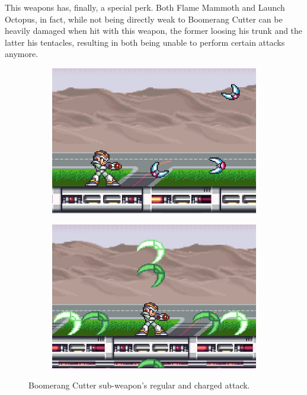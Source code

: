 This weapons has, finally, a special perk. Both Flame Mammoth and Launch Octopus, in fact, while not being directly weak to Boomerang Cutter can be heavily damaged when hit with this weapon, the former loosing his trunk and the latter his tentacles, resulting in both being unable to perform certain attacks anymore.
\begin{figure}[htp]
	\centering
	\begin{subfigure}{0.3\linewidth}
		\includegraphics[width=\linewidth]{figures/X1/weapons/Boomerang_1.jpg}
	\end{subfigure}
	\begin{subfigure}{0.3\linewidth}
		\includegraphics[width=\linewidth]{figures/X1/weapons/Boomerang_2.jpg}
	\end{subfigure}
	\caption{Boomerang Cutter sub-weapon's regular and charged attack.}
\end{figure}

